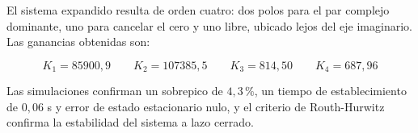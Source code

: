 \documentclass[12pt,a4paper]{article}
\begin{document}
El sistema expandido resulta de orden cuatro: dos polos para el par complejo dominante, uno para cancelar el cero y uno libre, ubicado lejos del eje imaginario. Las ganancias obtenidas son:

\begin{equation}\boxed{K_1=85900{,}9 \qquad K_2=107385{,}5 \qquad K_3=814{,}50 \qquad K_4=687{,}96}\end{equation}

Las simulaciones confirman un sobrepico de $4{,}3\,\text{\%}$, un tiempo de establecimiento de $0{,}06$ s y error de estado estacionario nulo, y el criterio de Routh-Hurwitz confirma la estabilidad del sistema a lazo cerrado.
\end{document}
